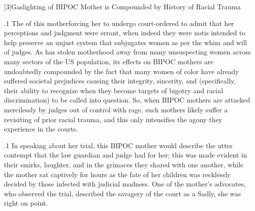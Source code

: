\documentclass[11pt, twoside]{article}
\begin{document}
{\s|3|{Gaslighting of BIPOC Mother is Compounded by History of Racial Trauma}

\p.1{%
\noindent{}The  of this mother\mdash{}forcing her to undergo court-ordered
 to admit that her perceptions and judgment were errant, when
indeed they were not\mdash{}is intended to help preserve an unjust system that
subjugates women as per the whim and will of judges. As 
has stolen motherhood away from many unsuspecting women across
many sectors of the US population, its effects on BIPOC mothers are
undoubtedly compounded by the fact that many women of color have
already suffered societal prejudices causing their integrity, sincerity, and
 (specifically, their ability to recognize when they become targets
of bigotry and racial discrimination) to be called into question. So, when
BIPOC mothers are attacked mercilessly by judges out of control with
rage, such mothers likely suffer a revisiting of prior racial trauma, and
this only intensifies the agony they experience in the courts.
}%

\p.1{%
In speaking about her trial, this BIPOC mother would describe the
utter contempt that the law guardian and judge had for her; this was
made evident in their smirks, laughter, and in the grimaces they shared
with one another, while the mother sat captively for hours as the fate of
her children was recklessly decided by those infected with judicial madness. One of the mother’s advocates, who observed the trial, described
the savagery of the court as a  Sadly, she was
right on point.
}%





}
\end{document}
